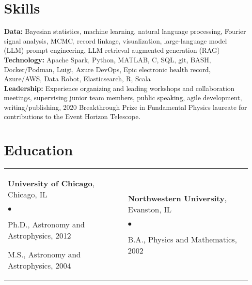 \documentclass[margin,line, 11pt]{res}
\newenvironment{list2}{
  \begin{list}{$\bullet$}{%
      \setlength{\itemsep}{0in}
      \setlength{\parsep}{0in} \setlength{\parskip}{0in}
      \setlength{\topsep}{0in} \setlength{\partopsep}{0in}
      \setlength{\leftmargin}{0.2in}}}{\end{list}}
\begin{document}
\begin{resume}
\section{Skills}
\textbf{Data:} Bayesian statistics, machine learning, natural language processing, Fourier signal analysis, MCMC, record linkage, visualization, large-language model (LLM) prompt engineering, LLM retrieval augmented generation (RAG)\\
\textbf{Technology:} Apache Spark, Python, MATLAB, C, SQL, git, BASH, Docker/Podman, Luigi, Azure DevOps, Epic electronic health record, Azure/AWS, Data Robot, Elasticsearch, R, Scala\\
\textbf{Leadership:} Experience organizing and leading workshops and collaboration meetings, supervising junior team members, public speaking, agile development, writing/publishing, 2020 Breakthrough Prize in Fundamental Physics laureate for contributions to the Event Horizon Telescope. \\
\vspace*{-7mm}

\section{Education}
\begin{tabular}{@{}p{3in}p{3in}}
  \textbf{University of Chicago}, Chicago, IL
  \begin{list2}
  	\item Ph.D., Astronomy and Astrophysics, 2012
    \item M.S., Astronomy and Astrophysics, 2004
  \end{list2} &
  \textbf{Northwestern University}, Evanston, IL
  \begin{list2}
  	\item B.A., Physics and Mathematics, 2002
  \end{list2} \\
\end{tabular}
\vspace*{-4mm}

\end{resume}
\end{document}
